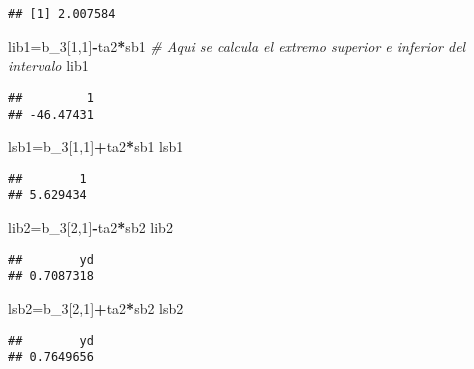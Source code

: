\documentclass[
]{article}
\newenvironment{Shaded}{\begin{snugshade}}{\end{snugshade}}
\newcommand{\CommentTok}[1]{\textcolor[rgb]{0.56,0.35,0.01}{\textit{#1}}}
\newcommand{\DecValTok}[1]{\textcolor[rgb]{0.00,0.00,0.81}{#1}}
\newcommand{\NormalTok}[1]{#1}
\newcommand{\OperatorTok}[1]{\textcolor[rgb]{0.81,0.36,0.00}{\textbf{#1}}}
\begin{document}
\begin{verbatim}
## [1] 2.007584
\end{verbatim}

\begin{Shaded}
\begin{Highlighting}[]
\NormalTok{lib1=b_}\DecValTok{3}\NormalTok{[}\DecValTok{1}\NormalTok{,}\DecValTok{1}\NormalTok{]}\OperatorTok{-}\NormalTok{ta2}\OperatorTok{*}\NormalTok{sb1   }\CommentTok{# Aqui se calcula el extremo superior e inferior del intervalo}
\NormalTok{lib1}
\end{Highlighting}
\end{Shaded}

\begin{verbatim}
##         1 
## -46.47431
\end{verbatim}

\begin{Shaded}
\begin{Highlighting}[]
\NormalTok{lsb1=b_}\DecValTok{3}\NormalTok{[}\DecValTok{1}\NormalTok{,}\DecValTok{1}\NormalTok{]}\OperatorTok{+}\NormalTok{ta2}\OperatorTok{*}\NormalTok{sb1}
\NormalTok{lsb1 }
\end{Highlighting}
\end{Shaded}

\begin{verbatim}
##        1 
## 5.629434
\end{verbatim}

\begin{Shaded}
\begin{Highlighting}[]
\NormalTok{lib2=b_}\DecValTok{3}\NormalTok{[}\DecValTok{2}\NormalTok{,}\DecValTok{1}\NormalTok{]}\OperatorTok{-}\NormalTok{ta2}\OperatorTok{*}\NormalTok{sb2}
\NormalTok{lib2}
\end{Highlighting}
\end{Shaded}

\begin{verbatim}
##        yd 
## 0.7087318
\end{verbatim}

\begin{Shaded}
\begin{Highlighting}[]
\NormalTok{lsb2=b_}\DecValTok{3}\NormalTok{[}\DecValTok{2}\NormalTok{,}\DecValTok{1}\NormalTok{]}\OperatorTok{+}\NormalTok{ta2}\OperatorTok{*}\NormalTok{sb2}
\NormalTok{lsb2}
\end{Highlighting}
\end{Shaded}

\begin{verbatim}
##        yd 
## 0.7649656
\end{verbatim}
\end{document}
